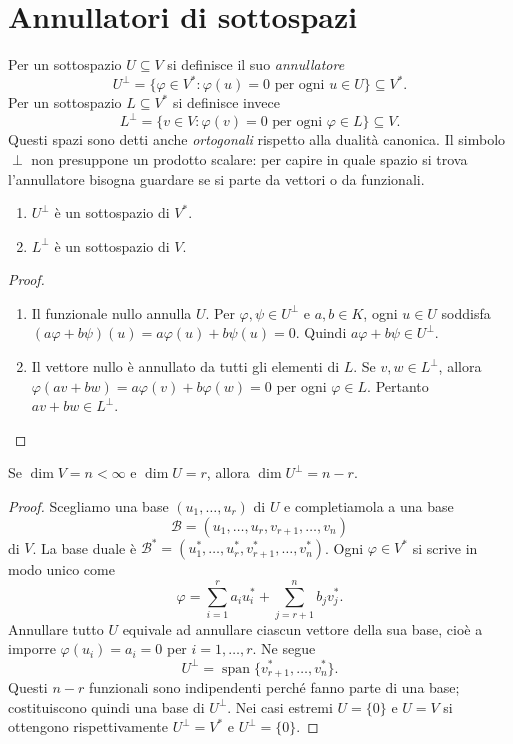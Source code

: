 \section{Annullatori di sottospazi}
\begin{definizione}
Per un sottospazio $U\subseteq V$ si definisce il suo \emph{annullatore}
\[
 U^\perp=\{\varphi\in V^*: \varphi(u)=0\text{ per ogni }u\in U\}\subseteq V^*.
\]
Per un sottospazio $L\subseteq V^*$ si definisce invece
\[
 L^\perp=\{v\in V:\varphi(v)=0\text{ per ogni }\varphi\in L\}\subseteq V.
\]
Questi spazi sono detti anche \emph{ortogonali} rispetto alla dualità canonica. Il simbolo $\perp$ non presuppone un prodotto scalare: per capire in quale spazio si trova l'annullatore bisogna guardare se si parte da vettori o da funzionali.
\end{definizione}
\begin{proposizione}
\begin{enumerate}[label=\arabic*.]
\item $U^\perp$ è un sottospazio di $V^*$.
\item $L^\perp$ è un sottospazio di $V$.
\end{enumerate}
\end{proposizione}
\begin{proof}
\begin{enumerate}[label=\arabic*.]
\item {} Il funzionale nullo annulla $U$. Per $\varphi,\psi\in U^\perp$ e $a,b\in K$, ogni $u\in U$ soddisfa $(a\varphi+b\psi)(u)=a\varphi(u)+b\psi(u)=0$. Quindi $a\varphi+b\psi\in U^\perp$.
\item {} Il vettore nullo è annullato da tutti gli elementi di $L$. Se $v,w\in L^\perp$, allora $\varphi(av+bw)=a\varphi(v)+b\varphi(w)=0$ per ogni $\varphi\in L$. Pertanto $av+bw\in L^\perp$.
\end{enumerate}
\end{proof}

\begin{teorema}
\label{teo:dimensione-annullatore}
Se $\dim V=n<\infty$ e $\dim U=r$, allora $\dim U^\perp=n-r$.
\end{teorema}
\begin{proof}
Scegliamo una base $(u_1,\ldots,u_r)$ di $U$ e completiamola a una base
\[
 \mathcal B=(u_1,\ldots,u_r,v_{r+1},\ldots,v_n)
\]
di $V$. La base duale è $\mathcal B^*=(u_1^*,\ldots,u_r^*,v_{r+1}^*,\ldots,v_n^*)$. Ogni $\varphi\in V^*$ si scrive in modo unico come
\[
 \varphi=\sum_{i=1}^r a_iu_i^*+\sum_{j=r+1}^n b_jv_j^*.
\]
Annullare tutto $U$ equivale ad annullare ciascun vettore della sua base, cioè a imporre $\varphi(u_i)=a_i=0$ per $i=1,\ldots,r$. Ne segue
\[
 U^\perp=\operatorname{span}\{v_{r+1}^*,\ldots,v_n^*\}.
\]
Questi $n-r$ funzionali sono indipendenti perché fanno parte di una base; costituiscono quindi una base di $U^\perp$. Nei casi estremi $U=\{0\}$ e $U=V$ si ottengono rispettivamente $U^\perp=V^*$ e $U^\perp=\{0\}$.
\end{proof}

